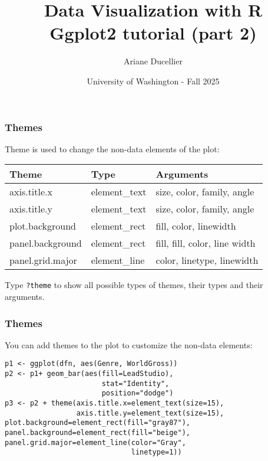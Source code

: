 \documentclass{beamer}
\title[Data Visualization with R - Ggplot2 tutorial (part 2)]{Data Visualization with R \\ Ggplot2 tutorial (part 2)}
\author{Ariane Ducellier}
\date{University of Washington - Fall 2025}
\begin{document}
	\begin{frame}
		\titlepage
	\end{frame}

	\begin{frame}[fragile]
		\frametitle{Themes}

		Theme is used to change the non-data elements of the plot:

		\vspace{1em}

		\begin{center}
		\begin{tabular}{|l|l|l|}
		\hline
    		Theme & Type & Arguments \\ 
		\hline
		axis.title.x & element\_text & size, color, family, angle \\
		\hline
		axis.title.y & element\_text & size, color, family, angle \\
		\hline
		plot.background & element\_rect & fill, color, linewidth \\
		\hline
		panel.background & element\_rect & fill, fill, color, line width \\
		\hline
		panel.grid.major & element\_line & color, linetype, linewidth \\
		\hline
		\end{tabular}
		\end{center}

		\vspace{1em}

		Type \verb|?theme| to show all possible types of themes, their types and their arguments.

	\end{frame}

	\begin{frame}[fragile]
		\frametitle{Themes}

		You can add themes to the plot to customize the non-data elements:

		\vspace{1em}

		\begin{exampleblock}{}
		\begin{BVerbatim}
p1 <- ggplot(dfn, aes(Genre, WorldGross)) 
p2 <- p1+ geom_bar(aes(fill=LeadStudio), 
                       stat="Identity",
                       position="dodge")
p3 <- p2 + theme(axis.title.x=element_text(size=15),
                 axis.title.y=element_text(size=15),
plot.background=element_rect(fill="gray87"),
panel.background=element_rect(fill="beige"),
panel.grid.major=element_line(color="Gray",
                              linetype=1))
		\end{BVerbatim}
		\end{exampleblock}{}

	\end{frame}
\end{document}
